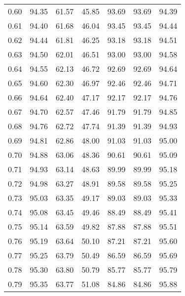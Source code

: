\begin{tabular}{|c|c|c|c|c|c|c|}
      0.60 &     94.35 &     61.57 &      45.85 &   93.69 &      93.69 &         94.39 \\
      0.61 &     94.40 &     61.68 &      46.04 &   93.45 &      93.45 &         94.44 \\
      0.62 &     94.44 &     61.81 &      46.25 &   93.18 &      93.18 &         94.51 \\
      0.63 &     94.50 &     62.01 &      46.51 &   93.00 &      93.00 &         94.58 \\
      0.64 &     94.55 &     62.13 &      46.72 &   92.69 &      92.69 &         94.64 \\
      0.65 &     94.60 &     62.30 &      46.97 &   92.46 &      92.46 &         94.71 \\
      0.66 &     94.64 &     62.40 &      47.17 &   92.17 &      92.17 &         94.76 \\
      0.67 &     94.70 &     62.57 &      47.46 &   91.79 &      91.79 &         94.85 \\
      0.68 &     94.76 &     62.72 &      47.74 &   91.39 &      91.39 &         94.93 \\
      0.69 &     94.81 &     62.86 &      48.00 &   91.03 &      91.03 &         95.00 \\
      0.70 &     94.88 &     63.06 &      48.36 &   90.61 &      90.61 &         95.09 \\
      0.71 &     94.93 &     63.14 &      48.63 &   89.99 &      89.99 &         95.18 \\
      0.72 &     94.98 &     63.27 &      48.91 &   89.58 &      89.58 &         95.25 \\
      0.73 &     95.03 &     63.35 &      49.17 &   89.03 &      89.03 &         95.33 \\
      0.74 &     95.08 &     63.45 &      49.46 &   88.49 &      88.49 &         95.41 \\
      0.75 &     95.14 &     63.59 &      49.82 &   87.88 &      87.88 &         95.51 \\
      0.76 &     95.19 &     63.64 &      50.10 &   87.21 &      87.21 &         95.60 \\
      0.77 &     95.25 &     63.79 &      50.49 &   86.59 &      86.59 &         95.69 \\
      0.78 &     95.30 &     63.80 &      50.79 &   85.77 &      85.77 &         95.79 \\
      0.79 &     95.35 &     63.77 &      51.08 &   84.86 &      84.86 &         95.88 \\

\end{tabular}
